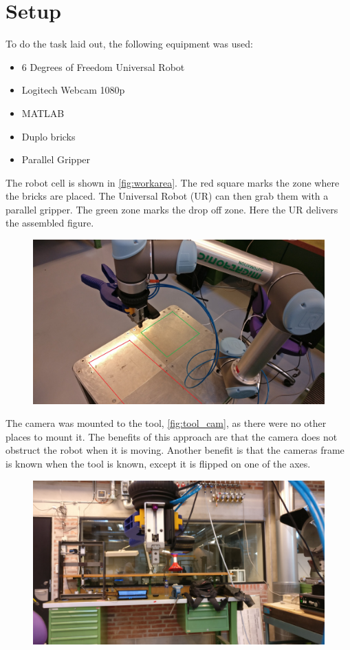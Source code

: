 \chapter{Setup}
To do the task laid out, the following equipment was used:

\begin{itemize}
\item 6 Degrees of Freedom Universal Robot
\item Logitech Webcam 1080p
\item MATLAB
\item \lego Duplo bricks
\item Parallel Gripper
\end{itemize}

The robot cell is shown in \autoref{fig:workarea}. The red square marks the zone where the bricks are placed. The Universal Robot (UR) can then grab them with a parallel gripper. The green zone marks the drop off zone. Here the UR delivers the assembled figure.

\begin{figure}[h]
\centering
\includegraphics[width=\textwidth]{figures/workarea.jpg}
\caption{}
\label{fig:workarea}
\end{figure}

The camera was mounted to the tool, \autoref{fig:tool_cam}, as there were no other places to mount it. The benefits of this approach are that the camera does not obstruct the robot when it is moving. Another benefit is that the cameras frame is known when the tool is known, except it is flipped on one of the axes.

\begin{figure}[h]
\centering
\includegraphics[width=\textwidth]{figures/tool_cam.jpg}
\caption{}
\label{fig:tool_cam}
\end{figure}
